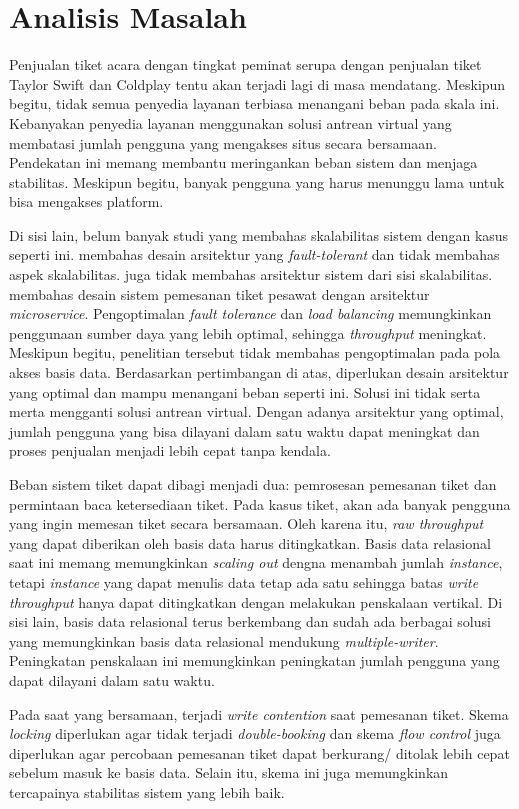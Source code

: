 
\section{Analisis Masalah}

Penjualan tiket acara dengan tingkat peminat serupa dengan penjualan tiket Taylor Swift dan Coldplay tentu akan terjadi lagi di masa mendatang. Meskipun begitu, tidak semua penyedia layanan terbiasa menangani beban pada skala ini. Kebanyakan penyedia layanan menggunakan solusi antrean virtual yang membatasi jumlah pengguna yang mengakses situs secara bersamaan. Pendekatan ini memang membantu meringankan beban sistem dan menjaga stabilitas. Meskipun begitu, banyak pengguna yang harus menunggu lama untuk bisa mengakses platform.

Di sisi lain, belum banyak studi yang membahas skalabilitas sistem dengan kasus seperti ini. \cite{microservicesEventDriven} membahas desain arsitektur yang \textit{fault-tolerant} dan tidak membahas aspek skalabilitas. \cite{backendForTicketing} juga tidak membahas arsitektur sistem dari sisi skalabilitas. \cite{barua2024enhancingresiliencescalabilitytravel} membahas desain sistem pemesanan tiket pesawat dengan arsitektur \textit{microservice}. Pengoptimalan \textit{fault tolerance} dan \textit{load balancing} memungkinkan penggunaan sumber daya yang lebih optimal, sehingga \textit{throughput} meningkat. Meskipun begitu, penelitian tersebut tidak membahas pengoptimalan pada pola akses basis data. Berdasarkan pertimbangan di atas, diperlukan desain arsitektur yang optimal dan mampu menangani beban seperti ini. Solusi ini tidak serta merta mengganti solusi antrean virtual. Dengan adanya arsitektur yang optimal, jumlah pengguna yang bisa dilayani dalam satu waktu dapat meningkat dan proses penjualan menjadi lebih cepat tanpa kendala.

Beban sistem tiket dapat dibagi menjadi dua: pemrosesan pemesanan tiket dan permintaan baca ketersediaan tiket. Pada kasus tiket, akan ada banyak pengguna yang ingin memesan tiket secara bersamaan. Oleh karena itu, \textit{raw throughput} yang dapat diberikan oleh basis data harus ditingkatkan. Basis data relasional saat ini memang memungkinkan \textit{scaling out} dengna menambah jumlah \textit{instance}, tetapi \textit{instance} yang dapat menulis data tetap ada satu sehingga batas \textit{write throughput} hanya dapat ditingkatkan dengan melakukan penskalaan vertikal. Di sisi lain, basis data relasional terus berkembang dan sudah ada berbagai solusi yang memungkinkan basis data relasional mendukung \textit{multiple-writer}. Peningkatan penskalaan ini memungkinkan peningkatan jumlah pengguna yang dapat dilayani dalam satu waktu.

Pada saat yang bersamaan, terjadi \textit{write contention} saat pemesanan tiket. Skema \textit{locking} diperlukan agar tidak terjadi \textit{double-booking} dan skema \textit{flow control} juga diperlukan agar percobaan pemesanan tiket dapat berkurang/ ditolak lebih cepat sebelum masuk ke basis data. Selain itu, skema ini juga memungkinkan tercapainya stabilitas sistem yang lebih baik.